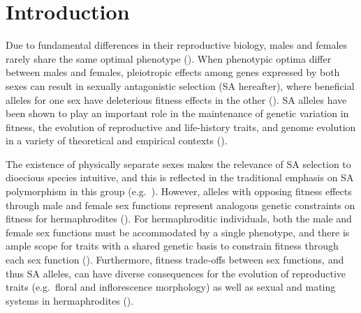 \documentclass{article}
\begin{document}
\newpage{}


\section*{Introduction}

Due to fundamental differences in their reproductive biology, males and females rarely share the same optimal phenotype (\citealt{Parker1979, KokkoJennions2008}). When phenotypic optima differ between males and females, pleiotropic effects among genes expressed by both sexes can result in sexually antagonistic selection (SA hereafter), where beneficial alleles for one sex have deleterious fitness effects in the other (\citealt{Kidwell1977, Rice1992, ConnClark2012}). SA alleles have been shown to play an important role in the maintenance of genetic variation in fitness, the evolution of reproductive and life-history traits, and genome evolution in a variety of theoretical and empirical contexts (\citealt{Barson2015, BondChen2009, CoxCals2010, ConnClark2012, Fry2010, Prout2000, Rice1992, RiceChipp2001}). 

The existence of physically separate sexes makes the relevance of SA selection to dioecious species intuitive, and this is reflected in the traditional emphasis on SA polymorphism in this group (e.g.~\citealt{Kidwell1977, Rice1992, Prout2000, ConnClark2012}). However, alleles with opposing fitness effects through male and female sex functions represent analogous genetic constraints on fitness for hermaphrodites (\citealt{Abbott2011, JordanConn2014,Tazzyman2015}). For hermaphroditic individuals, both the male and female sex functions must be accommodated by a single phenotype, and there is ample scope for traits with a shared genetic basis to constrain fitness through each sex function (\citealt{Abbott2011, Barrett2002, Conner2006, Sicard2011}). Furthermore, fitness trade-offs between sex functions, and thus SA alleles, can have diverse consequences for the evolution of reproductive traits (e.g.~floral and inflorescence morphology) as well as sexual and mating systems in hermaphrodites (\citealt{LloydWebb1986,WebbLloyd1986, Barrett2002, Abbott2011, Charlesworth1978, HarderBarrett2006, Goodwillie2005}).
\end{document}

